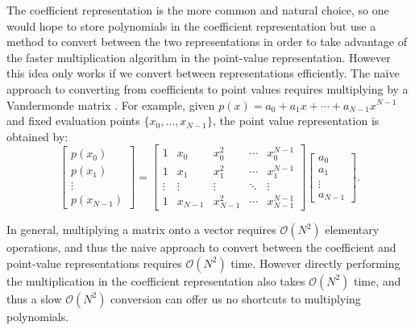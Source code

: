 \documentclass[prb,preprint]{revtex4}
\begin{document}
The coefficient representation is the more common and natural choice, so one would hope to store polynomials in the coefficient representation but use a method to convert between the two representations in order to take advantage of the faster multiplication algorithm in the point-value representation. However this idea only works if we convert between representations efficiently. The naive approach to converting from coefficients to point values requires multiplying by a Vandermonde matrix \cite{klinger1967vandermonde}. For example, given $p(x) = a_0 + a_1 x + \cdots + a_{N-1}x^{N-1}$ and fixed evaluation points $\{x_0, \ldots, x_{N-1}\}$, the point value representation is obtained by:
\begin{equation}
\begin{bmatrix}
	p(x_0) \\
	p(x_1) \\
	\vdots \\
	p(x_{N-1})
\end{bmatrix}
=
\begin{bmatrix}
	1 & x_0 & x_0^2 & \cdots & x_0^{N-1} \\
	1 & x_1 & x_1^2 & \cdots & x_1^{N-1} \\
	\vdots & \vdots & \vdots & \ddots & \vdots \\
	1 & x_{N-1} & x_{N-1}^2 & \cdots & x_{N-1}^{N-1}
\end{bmatrix}
\begin{bmatrix}
	a_0 \\ a_1 \\ \vdots \\ a_{N-1}
\end{bmatrix}.
\end{equation}

In general, multiplying a matrix onto a vector requires $\mathcal{O}(N^2)$ elementary operations, and thus the naive approach to convert between the coefficient and point-value representations requires $\mathcal{O}(N^2)$ time. However directly performing the multiplication in the coefficient representation also takes $\mathcal{O}(N^2)$ time, and thus a slow $\mathcal{O}(N^2)$ conversion can offer us no shortcuts to multiplying polynomials. 
\end{document}
